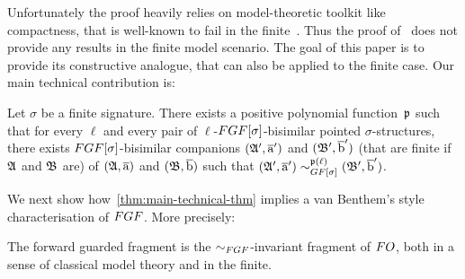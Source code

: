 Unfortunately the proof heavily relies on model-theoretic toolkit like compactness, that is well-known to fail in the finite~\cite[Prop.~3.2]{Libkin04}. Thus the proof of~\cite[Thm.~5]{BednarczykJ22} does not provide any results in the finite model scenario.
The goal of this paper is to provide its constructive analogue, that can also be applied to the finite case.
Our main technical contribution is:
\begin{theorem}\label{thm:main-technical-thm}
  Let $\sigma$ be a finite signature. 
  There exists a positive polynomial function~$\mathfrak{p}$ such that for every $\ell$ and every pair of $\ell$-$\FGF[\sigma]$-bisimilar pointed $\sigma$-structures, there exists $\FGF[\sigma]$-bisimilar companions $({\mathfrak{A}}', \overline{\mathrm{a}}')$ and $({\mathfrak{B}}', \overline{\mathrm{b}}')$ (that are finite if ${\mathfrak{A}}$ and ${\mathfrak{B}}$ are) of $({\mathfrak{A}}, \overline{\mathrm{a}})$ and $({\mathfrak{B}}, \overline{\mathrm{b}})$ such that $(\str{A}', \elemtuplea') \bisimto^{\homop(\ell)}_{\GF[\sigma]} (\str{B}', \elemtupleb')$.
\end{theorem}
We next show how~\cref{thm:main-technical-thm} implies a van Benthem's style characterisation of $\FGF$. More precisely:
\begin{theorem}
The forward guarded fragment is the $\bisimto_{\FGF}$-invariant fragment of $\FO$, both in a sense of classical model theory and in the finite.
\end{theorem}
